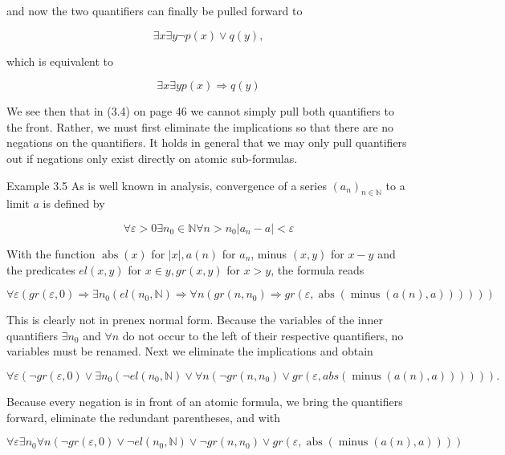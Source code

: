 \documentclass[10pt]{article}
\begin{document}
and now the two quantifiers can finally be pulled forward to

$$
\exists x \exists y \neg p(x) \vee q(y),
$$

which is equivalent to

$$
\exists x \exists y p(x) \Rightarrow q(y)
$$

We see then that in (3.4) on page 46 we cannot simply pull both quantifiers to the front. Rather, we must first eliminate the implications so that there are no negations on the quantifiers. It holds in general that we may only pull quantifiers out if negations only exist directly on atomic sub-formulas.

Example 3.5 As is well known in analysis, convergence of a series $\left(a_{n}\right)_{n \in \mathbb{N}}$ to a limit $a$ is defined by

$$
\forall \varepsilon>0 \exists n_{0} \in \mathbb{N} \forall n>n_{0}\left|a_{n}-a\right|<\varepsilon
$$

With the function $\operatorname{abs}(x)$ for $|x|, a(n)$ for $a_{n}$, minus $(x, y)$ for $x-y$ and the predicates $e l(x, y)$ for $x \in y, g r(x, y)$ for $x>y$, the formula reads


\begin{equation*}
\forall \varepsilon\left(g r(\varepsilon, 0) \Rightarrow \exists n_{0}\left(e l\left(n_{0}, \mathbb{N}\right) \Rightarrow \forall n\left(g r\left(n, n_{0}\right) \Rightarrow g r(\varepsilon, \operatorname{abs}(\operatorname{minus}(a(n), a)))\right)\right)\right) \tag{3.5}
\end{equation*}


This is clearly not in prenex normal form. Because the variables of the inner quantifiers $\exists n_{0}$ and $\forall n$ do not occur to the left of their respective quantifiers, no variables must be renamed. Next we eliminate the implications and obtain

$$
\forall \varepsilon\left(\neg g r(\varepsilon, 0) \vee \exists n_{0}\left(\neg e l\left(n_{0}, \mathbb{N}\right) \vee \forall n\left(\neg g r\left(n, n_{0}\right) \vee g r(\varepsilon, a b s(\operatorname{minus}(a(n), a)))\right)\right)\right) .
$$

Because every negation is in front of an atomic formula, we bring the quantifiers forward, eliminate the redundant parentheses, and with

$$
\forall \varepsilon \exists n_{0} \forall n\left(\neg g r(\varepsilon, 0) \vee \neg e l\left(n_{0}, \mathbb{N}\right) \vee \neg g r\left(n, n_{0}\right) \vee g r(\varepsilon, \operatorname{abs}(\operatorname{minus}(a(n), a)))\right)
$$
\end{document}
